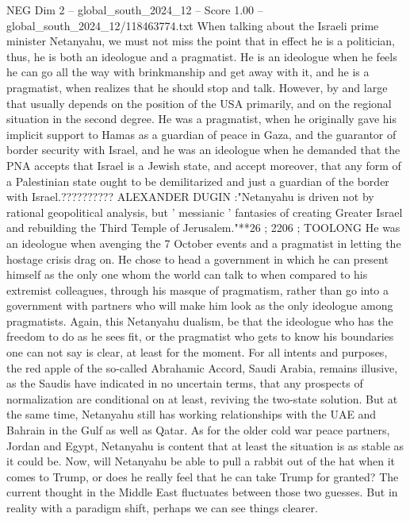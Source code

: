 \begin{textsample}{NEG Dim 2 – global\_south\_2024\_12 – Score 1.00 – global\_south\_2024\_12/118463774.txt}  \label{ex:f2_neg_381}
When talking about the Israeli prime minister Netanyahu, we must not miss the point that in effect he is a politician, thus, he is both an ideologue and a pragmatist.
He is an ideologue when he feels he can go all the way with brinkmanship and get away with it, and he is a pragmatist, when realizes that he should stop and talk.
However, by and large that usually depends on the position of the USA primarily, and on the regional situation in the second degree.
He was a pragmatist, when he originally gave his implicit support to Hamas as a guardian of peace in Gaza, and the guarantor of border security with Israel, and he was an ideologue when he demanded that the PNA accepts that Israel is a Jewish state, and accept moreover, that any form of a Palestinian state ought to be demilitarized and just a guardian of the border with Israel.??????????
ALEXANDER DUGIN :"Netanyahu is driven not by rational geopolitical analysis, but ' messianic ' fantasies of creating Greater Israel and rebuilding the Third Temple of Jerusalem."**26 ; 2206 ; TOOLONG He was an ideologue when avenging the 7 October events and a pragmatist in letting the hostage crisis drag on.
He chose to head a government in which he can present himself as the only one whom the world can talk to when compared to his extremist colleagues, through his masque of pragmatism, rather than go into a government with partners who will make him look as the only ideologue among pragmatists.
Again, this Netanyahu dualism, be that the ideologue who has the freedom to do as he sees fit, or the pragmatist who gets to know his boundaries one can not say is clear, at least for the moment.
For all intents and purposes, the red apple of the so-called Abrahamic Accord, Saudi Arabia, remains illusive, as the Saudis have indicated in no uncertain terms, that any prospects of normalization are conditional on at least, reviving the two-state solution.
But at the same time, Netanyahu still has working relationships with the UAE and Bahrain in the Gulf as well as Qatar.
As for the older cold war peace partners, Jordan and Egypt, Netanyahu is content that at least the situation is as stable as it could be.
Now, will Netanyahu be able to pull a rabbit out of the hat when it comes to Trump, or does he really feel that he can take Trump for granted?
The current thought in the Middle East fluctuates between those two guesses.
But in reality with a paradigm shift, perhaps we can see things clearer.

\end{textsample}
